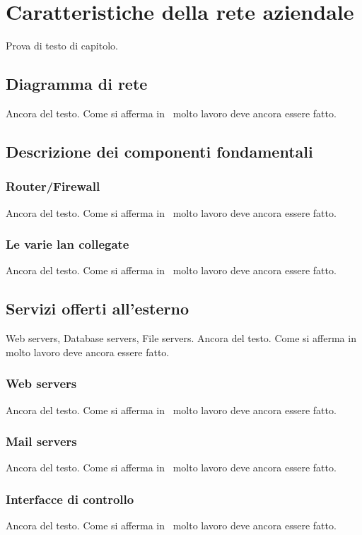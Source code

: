 \section{Caratteristiche della rete aziendale}

Prova di testo di capitolo.

\subsection{Diagramma di rete}

Ancora del testo. Come si afferma in~\cite{jones96analysis} molto lavoro deve ancora essere fatto.

\subsection{Descrizione dei componenti fondamentali}
\subsubsection{Router/Firewall}
Ancora del testo. Come si afferma in~\cite{jones96analysis} molto lavoro deve ancora essere fatto.

\subsubsection{Le varie lan collegate}
Ancora del testo. Come si afferma in~\cite{jones96analysis} molto lavoro deve ancora essere fatto.


\subsection{Servizi offerti all'esterno}

Web servers, Database servers, File servers. Ancora del testo. Come si afferma in~\cite{jones96analysis} molto lavoro deve ancora essere fatto.
\subsubsection{Web servers}
Ancora del testo. Come si afferma in~\cite{jones96analysis} molto lavoro deve ancora essere fatto.
\subsubsection{Mail servers}
Ancora del testo. Come si afferma in~\cite{jones96analysis} molto lavoro deve ancora essere fatto.
\subsubsection{Interfacce di controllo}
Ancora del testo. Come si afferma in~\cite{jones96analysis} molto lavoro deve ancora essere fatto.

